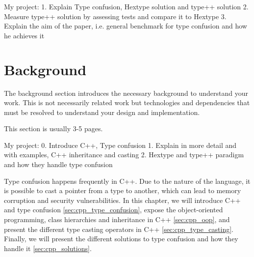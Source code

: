 \documentclass[a4paper,11pt,oneside]{report}
\begin{document}
My project: 
1. Explain Type confusion, Hextype solution and type++ solution
2. Measure type++ solution by assessing tests and compare it to Hextype
3. Explain the aim of the paper, i.e. general benchmark for type confusion and how he achieves it

\chapter{Background}

The background section introduces the necessary background to understand your
work. This is not necessarily related work but technologies and dependencies
that must be resolved to understand your design and implementation.

This section is usually 3-5 pages.

My project:
0. Introduce C++, Type confusion
1. Explain in more detail and with examples, C++ inheritance and casting
2. Hextype and type++ paradigm and how they handle type confusion

Type confusion happens frequently in C++. Due to the nature of the language, it is possible to cast a pointer from a type to another, 
which can lead to memory corruption and security vulnerabilities. In this chapter, we will introduce C++ and type confusion \autoref{sec:cpp_type_confusion},
expose the object-oriented programming, class hierarchies and inheritance in C++ \autoref{sec:cpp_oop}, and present the different type casting operators in C++ \autoref{sec:cpp_type_casting}. 
Finally, we will present the different solutions to type confusion and how they handle it \autoref{sec:cpp_solutions}.
\end{document}
